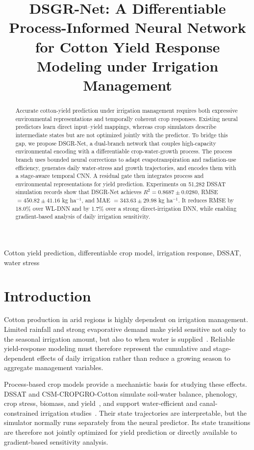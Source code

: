 \documentclass{article}
\title{DSGR-Net: A Differentiable Process-Informed Neural Network for Cotton Yield Response Modeling under Irrigation Management}
\begin{document}
\ninept
\maketitle

\begin{abstract}
Accurate cotton-yield prediction under irrigation management requires both expressive environmental representations and temporally coherent crop responses. Existing neural predictors learn direct input--yield mappings, whereas crop simulators describe intermediate states but are not optimized jointly with the predictor. To bridge this gap, we propose DSGR-Net, a dual-branch network that couples high-capacity environmental encoding with a differentiable crop-water-growth process. The process branch uses bounded neural corrections to adapt evapotranspiration and radiation-use efficiency, generates daily water-stress and growth trajectories, and encodes them with a stage-aware temporal CNN. A residual gate then integrates process and environmental representations for yield prediction. Experiments on 51,282 DSSAT simulation records show that DSGR-Net achieves $R^2=0.8687\pm0.0280$, RMSE $=450.82\pm41.16$ kg ha$^{-1}$, and MAE $=343.63\pm29.98$ kg ha$^{-1}$. It reduces RMSE by 18.0\% over WL-DNN and by 1.7\% over a strong direct-irrigation DNN, while enabling gradient-based analysis of daily irrigation sensitivity.
\end{abstract}

\begin{keywords}
Cotton yield prediction, differentiable crop model, irrigation response, DSSAT, water stress
\end{keywords}

\section{Introduction}
Cotton production in arid regions is highly dependent on irrigation management. Limited rainfall and strong evaporative demand make yield sensitive not only to the seasonal irrigation amount, but also to when water is supplied~\cite{garibay2019,chen2020,chen2026salinity}. Reliable yield-response modeling must therefore represent the cumulative and stage-dependent effects of daily irrigation rather than reduce a growing season to aggregate management variables.

Process-based crop models provide a mechanistic basis for studying these effects. DSSAT and CSM-CROPGRO-Cotton simulate soil-water balance, phenology, crop stress, biomass, and yield~\cite{jones2003,wang2024}, and support water-efficient and canal-constrained irrigation studies~\cite{garibay2019,wang2025}. Their state trajectories are interpretable, but the simulator normally runs separately from the neural predictor. Its state transitions are therefore not jointly optimized for yield prediction or directly available to gradient-based sensitivity analysis.
\end{document}
